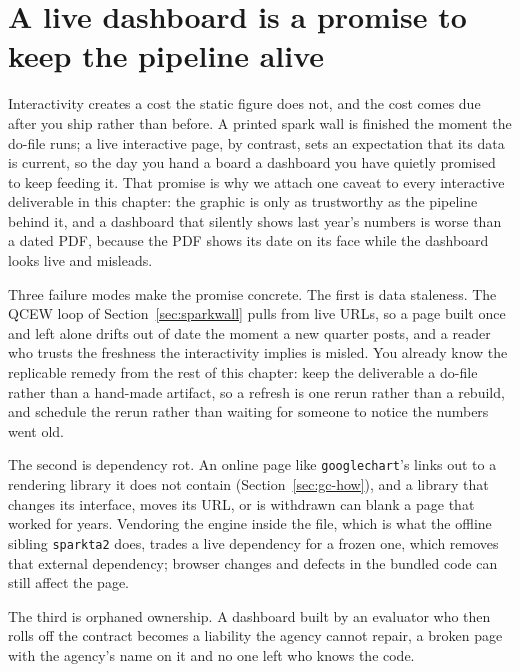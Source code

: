 \section{A live dashboard is a promise to keep the pipeline alive}\label{ch10-sec:maintenance}
Interactivity creates a cost the static figure does not, and the cost comes due after you ship rather than before. A printed spark wall is finished the moment the do-file runs; a live interactive page, by contrast, sets an expectation that its data is current, so the day you hand a board a dashboard you have quietly promised to keep feeding it. That promise is why we attach one caveat to every interactive deliverable in this chapter: the graphic is only as trustworthy as the pipeline behind it, and a dashboard that silently shows last year's numbers is worse than a dated PDF, because the PDF shows its date on its face while the dashboard looks live and misleads.

Three failure modes make the promise concrete. The first is data staleness. The QCEW loop of Section~\ref{sec:sparkwall} pulls from live URLs, so a page built once and left alone drifts out of date the moment a new quarter posts, and a reader who trusts the freshness the interactivity implies is misled. You already know the replicable remedy from the rest of this chapter: keep the deliverable a do-file rather than a hand-made artifact, so a refresh is one rerun rather than a rebuild, and schedule the rerun rather than waiting for someone to notice the numbers went old.

The second is dependency rot. An online page like \texttt{googlechart}'s links out to a rendering library it does not contain (Section~\ref{sec:gc-how}), and a library that changes its interface, moves its URL, or is withdrawn can blank a page that worked for years. Vendoring the engine inside the file, which is what the offline sibling \texttt{sparkta2} does, trades a live dependency for a frozen one, which removes that external dependency; browser changes and defects in the bundled code can still affect the page.

The third is orphaned ownership. A dashboard built by an evaluator who then rolls off the contract becomes a liability the agency cannot repair, a broken page with the agency's name on it and no one left who knows the code.

